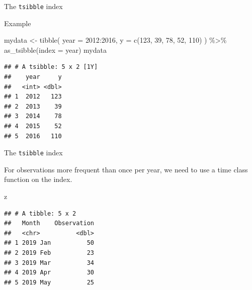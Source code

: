 \documentclass[14pt,ignorenonframetext,aspectratio=169]{beamer}
\newenvironment{Shaded}{\begin{snugshade}}{\end{snugshade}}
\newcommand{\AttributeTok}[1]{\textcolor[rgb]{0.77,0.63,0.00}{#1}}
\newcommand{\DecValTok}[1]{\textcolor[rgb]{0.00,0.00,0.81}{#1}}
\newcommand{\FunctionTok}[1]{\textcolor[rgb]{0.00,0.00,0.00}{#1}}
\newcommand{\NormalTok}[1]{#1}
\newcommand{\OtherTok}[1]{\textcolor[rgb]{0.56,0.35,0.01}{#1}}
\newcommand{\SpecialCharTok}[1]{\textcolor[rgb]{0.00,0.00,0.00}{#1}}
\renewenvironment{Shaded}{\color{black}\begin{snugshade}\color{black}}{\end{snugshade}}
\renewenvironment{Shaded}{\color{black}\fontsize{10}{10}\sf\begin{snugshade}\color{black}}{\end{snugshade}}
\begin{document}
\begin{frame}[fragile]{The \texttt{tsibble} index}
\protect\hypertarget{the-tsibble-index-1}{}
\begin{block}{Example}
\protect\hypertarget{example-1}{}
\fontsize{11}{12}\sf

\begin{Shaded}
\begin{Highlighting}[]
\NormalTok{mydata }\OtherTok{\textless{}{-}} \FunctionTok{tibble}\NormalTok{(}
    \AttributeTok{year =} \DecValTok{2012}\SpecialCharTok{:}\DecValTok{2016}\NormalTok{,}
    \AttributeTok{y =} \FunctionTok{c}\NormalTok{(}\DecValTok{123}\NormalTok{, }\DecValTok{39}\NormalTok{, }\DecValTok{78}\NormalTok{, }\DecValTok{52}\NormalTok{, }\DecValTok{110}\NormalTok{)}
\NormalTok{  ) }\SpecialCharTok{\%\textgreater{}\%}
  \FunctionTok{as\_tsibble}\NormalTok{(}\AttributeTok{index =}\NormalTok{ year)}
\NormalTok{mydata}
\end{Highlighting}
\end{Shaded}

\begin{verbatim}
## # A tsibble: 5 x 2 [1Y]
##    year     y
##   <int> <dbl>
## 1  2012   123
## 2  2013    39
## 3  2014    78
## 4  2015    52
## 5  2016   110
\end{verbatim}
\end{block}
\end{frame}

\begin{frame}[fragile]{The \texttt{tsibble} index}
\protect\hypertarget{the-tsibble-index-2}{}
\begin{block}{}
For observations more frequent than once per year, we need to use a time class function on the index.
\end{block}
\fontsize{12}{13}\sf

\begin{Shaded}
\begin{Highlighting}[]
\NormalTok{z}
\end{Highlighting}
\end{Shaded}

\begin{verbatim}
## # A tibble: 5 x 2
##   Month    Observation
##   <chr>          <dbl>
## 1 2019 Jan          50
## 2 2019 Feb          23
## 3 2019 Mar          34
## 4 2019 Apr          30
## 5 2019 May          25
\end{verbatim}
\end{frame}
\end{document}
